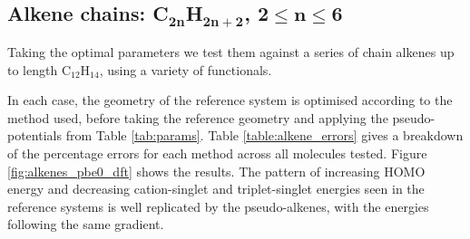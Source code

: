 \documentclass[aip]{revtex4-1}
\begin{document}
\subsection{Alkene chains: C\(\mathbf{_{2n}}\)H\(\mathbf{_{2n+2}}\), \(\mathbf{2 \leq n \leq 6}\)}

Taking the optimal parameters we test them against a series of chain alkenes up to
length C\(_{12}\)H\(_{14}\), using a variety of functionals.

In each case, the geometry of the reference system is optimised according to the method used,
before taking the reference geometry and applying the pseudo-potentials from Table \ref{tab:params}. Table \ref{table:alkene_errors} gives a breakdown of the percentage errors for each method
across all molecules tested.
Figure \ref{fig:alkenes_pbe0_dft} shows the results.
The pattern of increasing HOMO energy and decreasing cation-singlet and triplet-singlet
energies seen in the reference systems is well replicated by the pseudo-alkenes,
with the energies following the same gradient.
\end{document}
